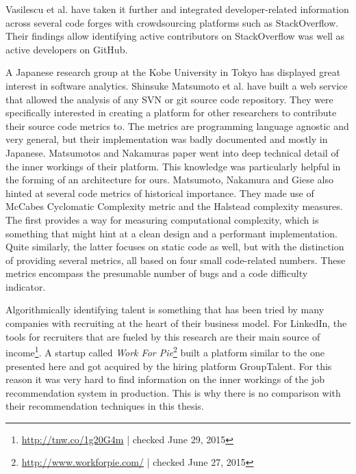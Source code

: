 Vasilescu et al.\cite{vfs:2012} have taken it further and integrated developer-related information across several code forges with crowdsourcing platforms such as StackOverflow.
Their findings allow identifying active contributors on StackOverflow was well as active developers on GitHub.
\newline

A Japanese research group at the Kobe University in Tokyo has displayed great interest in software analytics. Shinsuke Matsumoto et al.\cite{mn:2011} have built a web service that allowed the analysis of any SVN or git source code repository. They were specifically interested in creating a platform for other researchers to contribute their source code metrics to. The metrics are programming language agnostic and very general, but their implementation was badly documented and mostly in Japanese. Matsumotos and Nakamuras paper went into deep technical detail of the inner workings of their platform. This knowledge was particularly helpful in the forming of an architecture for ours. Matsumoto, Nakamura and Giese also hinted at several code metrics of historical importance. They made use of McCabes Cyclomatic Complexity metric\cite{mc:1976} and the Halstead complexity measures\cite{h:1977}. The first provides a way for measuring computational complexity, which is something that might hint at a clean design and a performant implementation. Quite similarly, the latter focuses on static code as well, but with the distinction of providing several metrics, all based on four small code-related numbers. These metrics encompass the presumable number of bugs and a code difficulty indicator.
\newline

Algorithmically identifying talent is something that has been tried by many companies with recruiting at the heart of their business model. For LinkedIn, the tools for recruiters that are fueled by this research are their main source of income\footnote{\url{http://tnw.co/1g20G4m} | checked June 29, 2015}. A startup called \textit{Work For Pie}\footnote{\url{http://www.workforpie.com/} | checked June 27, 2015} built a platform similar to the one presented here and got acquired by the hiring platform GroupTalent. For this reason it was very hard to find information on the inner workings of the job recommendation system in production. This is why there is no comparison with their recommendation techniques in this thesis.


